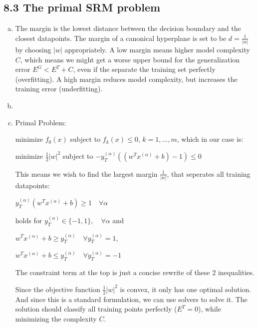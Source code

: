 \documentclass[10pt,a4paper]{article}
\begin{document}
\subsection*{8.3 The primal SRM problem}
\begin{enumerate}[a)]
\item
The margin is the lowest distance between the decision boundary and the closest datapoints. The margin of a canonical hyperplane is set to be $d = \frac{1}{|w|}$ by choosing $|w|$ appropriately.
A low margin means higher model complexity $C$, which means we might get a worse upper bound for the generalization error $E^G < E^T + C$, even if the separate the training set perfectly (overfitting).
A high margin reduces model complexity, but increases the training error (underfitting).
\item

\item
Primal Problem:

minimize $f_{0}(x)$ subject to $f_{k}(x) \leq 0$, $k=1,...,m$, which in our case is:

minimize $\frac{1}{2}|w|^2$ subject to $-y_T^{(\alpha)}((w^Tx^{(\alpha)}+b)-1) \leq 0$

This means we wish to find the largest margin $\frac{1}{|w|}$, that seperates all training datapoints:

$y_T^{(\alpha)}(w^Tx^{(\alpha)} + b) \geq 1 \quad \forall \alpha$

holds for
$y_T^{(\alpha)} \in \{-1, 1\}, \quad \forall \alpha$ and

$ w^Tx^{(\alpha)} + b \geq y_T^{(\alpha)} \quad \forall y_T^{(\alpha)} = 1$,

$ w^Tx^{(\alpha)} + b \leq y_T^{(\alpha)} \quad \forall y_T^{(\alpha)} = -1$

The constraint term at the top is just a concise rewrite of these 2 inequalities.

Since the objective function $\frac{1}{2}|w|^2$ is convex, it only has one optimal solution. And since this is a standard formulation, we can use solvers to solve it.
The solution should classify all training points perfectly ($E^T = 0$), while minimizing the complexity $C$.

\end{enumerate}
\end{document}

